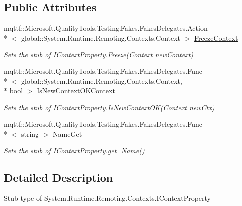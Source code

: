 \subsection*{Public Attributes}
\begin{DoxyCompactItemize}
\item 
mqttf\-::\-Microsoft.\-Quality\-Tools.\-Testing.\-Fakes.\-Fakes\-Delegates.\-Action\\*
$<$ global\-::\-System.\-Runtime.\-Remoting.\-Contexts.\-Context $>$ \hyperlink{class_system_1_1_runtime_1_1_remoting_1_1_contexts_1_1_fakes_1_1_stub_i_context_property_a4ac611a02dbe418d0cbcd254e8a2643e}{Freeze\-Context}
\begin{DoxyCompactList}\small\item\em Sets the stub of I\-Context\-Property.\-Freeze(\-Context new\-Context)\end{DoxyCompactList}\item 
mqttf\-::\-Microsoft.\-Quality\-Tools.\-Testing.\-Fakes.\-Fakes\-Delegates.\-Func\\*
$<$ global\-::\-System.\-Runtime.\-Remoting.\-Contexts.\-Context, \\*
bool $>$ \hyperlink{class_system_1_1_runtime_1_1_remoting_1_1_contexts_1_1_fakes_1_1_stub_i_context_property_a6f7288580ccc240170190b2cb0d035e9}{Is\-New\-Context\-O\-K\-Context}
\begin{DoxyCompactList}\small\item\em Sets the stub of I\-Context\-Property.\-Is\-New\-Context\-O\-K(\-Context new\-Ctx)\end{DoxyCompactList}\item 
mqttf\-::\-Microsoft.\-Quality\-Tools.\-Testing.\-Fakes.\-Fakes\-Delegates.\-Func\\*
$<$ string $>$ \hyperlink{class_system_1_1_runtime_1_1_remoting_1_1_contexts_1_1_fakes_1_1_stub_i_context_property_ad82baaa3ce61fc5e13cf64004e41b700}{Name\-Get}
\begin{DoxyCompactList}\small\item\em Sets the stub of I\-Context\-Property.\-get\-\_\-\-Name()\end{DoxyCompactList}\end{DoxyCompactItemize}


\subsection{Detailed Description}
Stub type of System.\-Runtime.\-Remoting.\-Contexts.\-I\-Context\-Property



